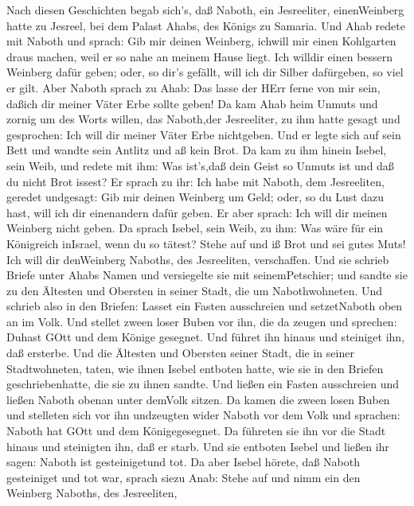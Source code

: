  Nach diesen Geschichten begab sich's, daß Naboth, ein
Jesreeliter, einenWeinberg hatte zu Jesreel, bei dem Palast Ahabs, des
Königs zu Samaria.  Und Ahab redete mit Naboth und sprach:
Gib mir deinen Weinberg, ichwill mir einen Kohlgarten draus machen, weil
er so nahe an meinem Hause liegt. Ich willdir einen bessern Weinberg
dafür geben; oder, so dir's gefällt, will ich dir Silber dafürgeben, so
viel er gilt.  Aber Naboth sprach zu Ahab: Das lasse der
HErr ferne von mir sein, daßich dir meiner Väter Erbe sollte geben!
 Da kam Ahab heim Unmuts und zornig um des Worts willen, das
Naboth,der Jesreeliter, zu ihm hatte gesagt und gesprochen: Ich will dir
meiner Väter Erbe nichtgeben. Und er legte sich auf sein Bett und wandte
sein Antlitz und aß kein Brot.  Da kam zu ihm hinein Isebel,
sein Weib, und redete mit ihm: Was ist's,daß dein Geist so Unmuts ist
und daß du nicht Brot issest?  Er sprach zu ihr: Ich habe
mit Naboth, dem Jesreeliten, geredet undgesagt: Gib mir deinen Weinberg
um Geld; oder, so du Lust dazu hast, will ich dir einenandern dafür
geben. Er aber sprach: Ich will dir meinen Weinberg nicht geben.
 Da sprach Isebel, sein Weib, zu ihm: Was wäre für ein
Königreich inIsrael, wenn du so tätest? Stehe auf und iß Brot und sei
gutes Muts! Ich will dir denWeinberg Naboths, des Jesreeliten,
verschaffen.  Und sie schrieb Briefe unter Ahabs Namen und
versiegelte sie mit seinemPetschier; und sandte sie zu den Ältesten und
Obersten in seiner Stadt, die um Nabothwohneten.  Und
schrieb also in den Briefen: Lasset ein Fasten ausschreien und
setzetNaboth oben an im Volk.  Und stellet zween loser
Buben vor ihn, die da zeugen und sprechen: Duhast GOtt und dem Könige
gesegnet. Und führet ihn hinaus und steiniget ihn, daß ersterbe.
 Und die Ältesten und Obersten seiner Stadt, die in seiner
Stadtwohneten, taten, wie ihnen Isebel entboten hatte, wie sie in den
Briefen geschriebenhatte, die sie zu ihnen sandte.  Und
ließen ein Fasten ausschreien und ließen Naboth obenan unter demVolk
sitzen.  Da kamen die zween losen Buben und stelleten sich
vor ihn undzeugten wider Naboth vor dem Volk und sprachen: Naboth hat
GOtt und dem Königegesegnet. Da führeten sie ihn vor die Stadt hinaus
und steinigten ihn, daß er starb.  Und sie entboten Isebel
und ließen ihr sagen: Naboth ist gesteinigetund tot.  Da
aber Isebel hörete, daß Naboth gesteiniget und tot war, sprach siezu
Anab: Stehe auf und nimm ein den Weinberg Naboths, des Jesreeliten,

